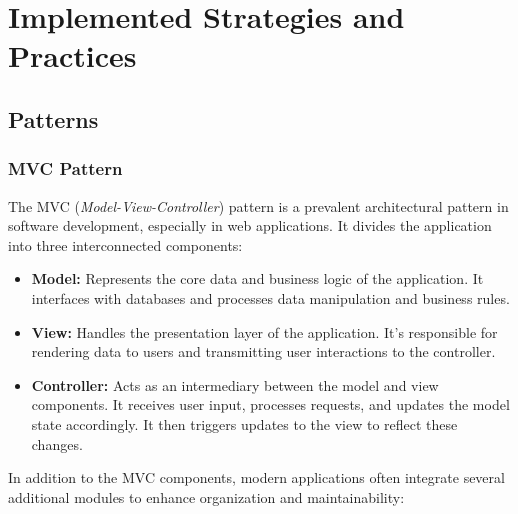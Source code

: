 \vspace{\baselineskip}

\section{Implemented Strategies and Practices}
\subsection*{Patterns}

\subsubsection*{MVC Pattern}

The MVC (\textit{Model-View-Controller}) pattern is a prevalent architectural pattern in software development, especially in web 
applications. It divides the application into three interconnected components:

\begin{itemize}
\item \textbf{Model:} Represents the core data and business logic of the application. It interfaces with databases and processes 
data manipulation and business rules.

\item \textbf{View:} Handles the presentation layer of the application. It's responsible for rendering data to users and 
transmitting user interactions to the controller.

\item \textbf{Controller:} Acts as an intermediary between the model and view components. It receives user input, 
processes requests, and updates the model state accordingly. It then triggers updates to the view to reflect these changes.
\end{itemize}

\vspace{\baselineskip}

In addition to the MVC components, modern applications often integrate several additional modules to enhance organization and maintainability:

